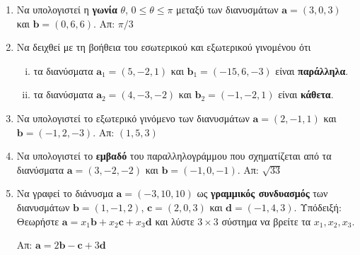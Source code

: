 


\geometry{top=2.5cm}
\pagestyle{askhseis}

\renewcommand{\vec}{\mathbf}




\begin{center}
  \minibox{\large \bfseries \textcolor{Col1}{Ασκήσεις στα Διανύσματα}}
\end{center}

\vspace{\baselineskip}

\begin{enumerate}[itemsep=0.7\baselineskip]

  \item Να υπολογιστεί η \textbf{γωνία} $ \theta $, $ 0\leq \theta \leq \pi $ μεταξύ των 
    διανυσμάτων $ \vec{a} = (3,0,3) $ και $ \vec{b} = (0,6,6) $.
    \hfill Απ: $ \pi/{3} $

  \item Να δειχθεί με τη βοήθεια του εσωτερικού και εξωτερικού γινομένου ότι
    \begin{enumerate}[i)]
      \item τα διανύσματα $ \vec{a}_1 = (5,-2,1) $ και $ \vec{b}_1 = (-15,6,-3) $ είναι 
        \textbf{παράλληλα}.
      \item τα διανύσματα $ \vec{a}_2 = (4,-3,-2) $ και $ \vec{b}_2 = (-1,-2,1) $ είναι 
        \textbf{κάθετα}.
    \end{enumerate}

  \item Να υπολογιστεί το εξωτερικό γινόμενο των διανυσμάτων 
    $ \vec{a} = (2,-1,1) $ και $ \vec{b} = (-1,2,-3) $.
    \hfill Απ: $ (1,5,3) $

  \item Να υπολογιστεί το \textbf{εμβαδό} του παραλληλογράμμου που σχηματίζεται από τα 
    διανύσματα $ \vec{a} = (3,-2,-2) $ και $ \vec{b} = (-1,0,-1) $.
    \hfill Απ: $ \sqrt{33} $ 

  \item Να γραφεί το διάνυσμα $ \vec{a}=(-3,10,10) $ ως \textbf{γραμμικός συνδυασμός} 
    των διανυσμάτων $\vec{b}=(1,-1,2)$, $ \vec{c}=(2,0,3) $ και $ \vec{d}=(-1,4,3) $.  
    \hfill 
    \textcolor{Col1}{Υπόδειξή:} Θεωρήστε 
    $ \mathbf{a} = x_{1} \mathbf{b} + x_{2} \mathbf{c} + x_{3} \mathbf{d}$ και λύστε 
    $ 3\times 3 $ σύστημα να βρείτε τα $ x_{1}, x_{2}, x_{3} $. 

    \hfill Απ: $ \vec{a}=2\vec{b}-\vec{c}+3\vec{d} $


\end{enumerate}
